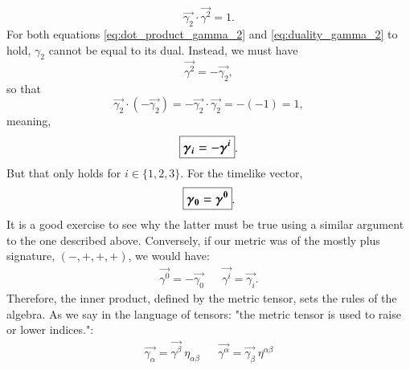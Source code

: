 \begin{equation} \label{eq:duality_gamma_2}
    \vec{\gamma_2} \cdot \vec{\gamma^2} = 1.
\end{equation}
For both equations \eqref{eq:dot_product_gamma_2} and \eqref{eq:duality_gamma_2} to hold, $\gamma_2$ cannot be equal to its dual. Instead, we must have 
\begin{equation}
    \vec{\gamma^2} = - \vec{\gamma_2},
\end{equation}
so that 
$$ \vec{\gamma_2} \cdot (-\vec{\gamma_2} )= - \vec{\gamma_2} \cdot \vec{\gamma_2} =  -(-1) = 1, $$
meaning,
\begin{equation} 
    \large\boxed{\vec{\gamma_i} = - \vec{\gamma^i}}. 
\end{equation}
But that only holds for $i \in \{ 1, 2,3\}$. For the timelike vector, 
\begin{equation}
    \large\boxed{\vec{\gamma_0} =  \vec{\gamma^0}}.  
\end{equation}
It is a good exercise to see why the latter must be true using a similar argument to the one described above. Conversely, if our metric was of the mostly plus signature, $(-, +, +, +)$, we would have:
\begin{align*}
    \vec{\gamma^0} = - \vec{\gamma_0 } && \vec{\gamma^i} = \vec{ \gamma_i}.
\end{align*}
Therefore, the inner product, defined by the metric tensor, sets the rules of the algebra. As we say in the language of tensors: "the metric tensor is used to raise or lower indices.":
\begin{align*}
\vec{\gamma_\alpha} = \vec{\gamma^\beta } \ \eta_{\alpha \beta} && 
\vec{\gamma^\alpha} = \vec{\gamma_\beta } \ \eta^{\alpha \beta} 
\end{align*}


